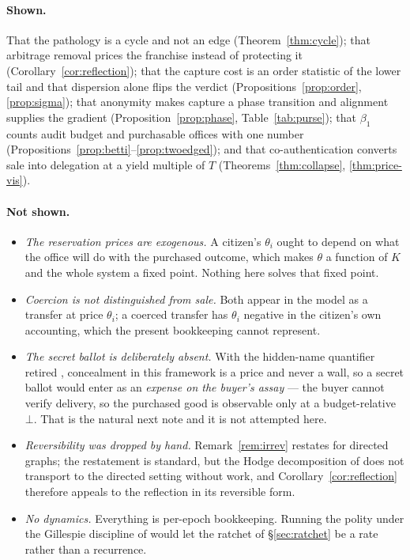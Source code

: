 \documentclass[11pt]{article}
\theoremstyle{plain}
\theoremstyle{definition}
\theoremstyle{remark}
\newcommand{\bt}{\beta_1}
\begin{document}
\paragraph{Shown.} That the pathology is a cycle and not an edge
(Theorem~\ref{thm:cycle}); that arbitrage removal prices the franchise instead
of protecting it (Corollary~\ref{cor:reflection}); that the capture cost is an
order statistic of the lower tail and that dispersion alone flips the verdict
(Propositions~\ref{prop:order}, \ref{prop:sigma}); that anonymity makes capture
a phase transition and alignment supplies the gradient
(Proposition~\ref{prop:phase}, Table~\ref{tab:purse}); that $\bt$ counts audit
budget and purchasable offices with one number
(Propositions~\ref{prop:betti}--\ref{prop:twoedged}); and that
co-authentication converts sale into delegation at a yield multiple of $T$
(Theorems~\ref{thm:collapse}, \ref{thm:price-vis}).

\paragraph{Not shown.}
\begin{itemize}[leftmargin=1.4em]
\item \emph{The reservation prices are exogenous.} A citizen's $\theta_i$ ought
to depend on what the office will do with the purchased outcome, which makes
$\theta$ a function of $K$ and the whole system a fixed point. Nothing here
solves that fixed point.
\item \emph{Coercion is not distinguished from sale.} Both appear in the model
as a transfer at price $\theta_i$; a coerced transfer has $\theta_i$ negative in
the citizen's own accounting, which the present bookkeeping cannot represent.
\item \emph{The secret ballot is deliberately absent.} With the hidden-name
quantifier retired \cite[\S3]{scientist}, concealment in this framework is a
price and never a wall, so a secret ballot would enter as an \emph{expense on
the buyer's assay} --- the buyer cannot verify delivery, so the purchased good
is observable only at a budget-relative $\bot$. That is the natural next note
and it is not attempted here.
\item \emph{Reversibility was dropped by hand.} Remark~\ref{rem:irrev} restates
\cite[Thm.~3.3]{vtok} for directed graphs; the restatement is standard, but the
Hodge decomposition of \cite[\S4]{vtok} does not transport to the directed
setting without work, and Corollary~\ref{cor:reflection} therefore appeals to
the reflection in its reversible form.
\item \emph{No dynamics.} Everything is per-epoch bookkeeping. Running the
polity under the Gillespie discipline of \cite{weighted} would let the ratchet
of \S\ref{sec:ratchet} be a rate rather than a recurrence.
\end{itemize}
\end{document}
